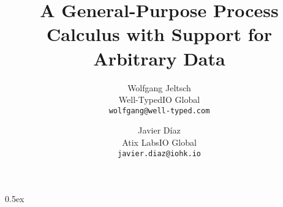 \documentclass[a4paper,11pt]{article}
\newcommand{\authorinfo}[3]
    {#1\medskip\\\small#2\smallskip\\\small\texttt{#3}}
\newcommand{\andalso}
    {\quad\enspace}
\begin{document}
\title{A General-Purpose Process Calculus with Support for Arbitrary Data}
\author{%
    \authorinfo
        {Wolfgang Jeltsch}
        {Well-Typed\andalso IO Global}
        {wolfgang@well-typed.com}%
    \and
    \authorinfo
        {Javier Díaz}
        {Atix Labs\andalso IO Global}
        {javier.diaz@iohk.io}%
}

\maketitle

\tableofcontents

\parindent 0pt\parskip 0.5ex


\end{document}
